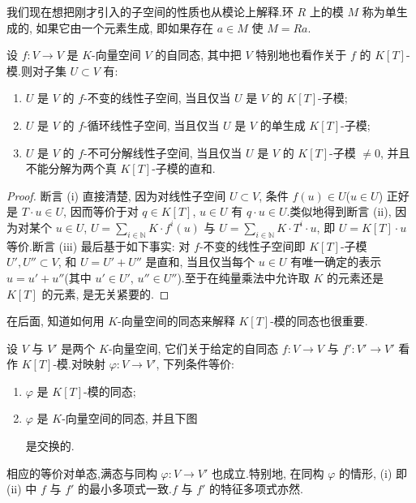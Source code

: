 我们现在想把刚才引入的子空间的性质也从模论上解释.环 $R$ 上的模 $M$ 称为单生成的, 如果它由一个元素生成, 即如果存在 $a \in M$ 使 $M = Ra$.

\begin{remark}\label{rem:6.5.2}
设 $f \colon V \longrightarrow V$ 是 $K$-向量空间 $V$ 的自同态, 其中把 $V$ 特别地也看作关于 $f$ 的 $K[T]$-模.则对子集 $U \subset V$ 有:
\begin{enumerate}
\item[(i)] $U$ 是 $V$ 的 $f$-不变的线性子空间, 当且仅当 $U$ 是 $V$ 的 $K[T]$-子模;
\item[(ii)] $U$ 是 $V$ 的 $f$-循环线性子空间, 当且仅当 $U$ 是 $V$ 的单生成 $K[T]$-子模;
\item[(iii)] $U$ 是 $V$ 的 $f$-不可分解线性子空间, 当且仅当 $U$ 是 $V$ 的 $K[T]$-子模 $\neq 0$, 并且不能分解为两个真 $K[T]$-子模的直和.
\end{enumerate}
\end{remark}

\begin{proof}
断言 (i) 直接清楚, 因为对线性子空间 $U \subset V$, 条件 $f(u) \in U$($u \in U$) 正好是 $T \cdot u \in U$, 因而等价于对 $q \in K[T]$, $u \in U$ 有 $q \cdot u \in U$.类似地得到断言 (ii), 因为对某个 $u \in U$, $U = \sum_{i \in \mathbb{N}} K \cdot f^i(u)$ 与 $U = \sum_{i \in \mathbb{N}} K \cdot T^i \cdot u$, 即 $U = K[T] \cdot u$ 等价.断言 (iii) 最后基于如下事实: 对 $f$-不变的线性子空间即 $K[T]$-子模 $U', U'' \subset V$, 和 $U = U' + U''$ 是直和, 当且仅当每个 $u \in U$ 有唯一确定的表示 $u = u' + u''$(其中 $u' \in U'$, $u'' \in U''$).至于在纯量乘法中允许取 $K$ 的元素还是 $K[T]$ 的元素, 是无关紧要的.
\end{proof}

在后面, 知道如何用 $K$-向量空间的同态来解释 $K[T]$-模的同态也很重要.

\begin{remark}\label{rem:6.5.3}
设 $V$ 与 $V'$ 是两个 $K$-向量空间, 它们关于给定的自同态 $f \colon V \longrightarrow V$ 与 $f' \colon V' \longrightarrow V'$ 看作 $K[T]$-模.对映射 $\varphi \colon V \longrightarrow V'$, 下列条件等价:
\begin{enumerate}
\item[(i)] $\varphi$ 是 $K[T]$-模的同态;
\item[(ii)] $\varphi$ 是 $K$-向量空间的同态, 并且下图

\begin{center}
\end{center}

是交换的.
\end{enumerate}
相应的等价对单态,满态与同构 $\varphi \colon V \longrightarrow V'$ 也成立.特别地, 在同构 $\varphi$ 的情形, (i) 即 (ii) 中 $f$ 与 $f'$ 的最小多项式一致.$f$ 与 $f'$ 的特征多项式亦然.
\end{remark}

